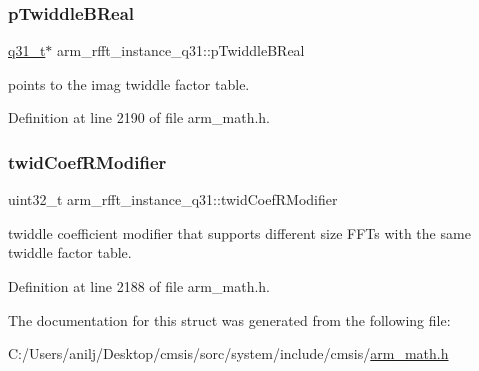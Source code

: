 \subsubsection{\texorpdfstring{p\+Twiddle\+B\+Real}{pTwiddleBReal}}
{\footnotesize\ttfamily \hyperlink{arm__math_8h_adc89a3547f5324b7b3b95adec3806bc0}{q31\+\_\+t}$\ast$ arm\+\_\+rfft\+\_\+instance\+\_\+q31\+::p\+Twiddle\+B\+Real}

points to the imag twiddle factor table. 

Definition at line 2190 of file arm\+\_\+math.\+h.

\mbox{\label{structarm__rfft__instance__q31_a6fc90252b579f7c29e01bd279334fc43}} 
\subsubsection{\texorpdfstring{twid\+Coef\+R\+Modifier}{twidCoefRModifier}}
{\footnotesize\ttfamily uint32\+\_\+t arm\+\_\+rfft\+\_\+instance\+\_\+q31\+::twid\+Coef\+R\+Modifier}

twiddle coefficient modifier that supports different size F\+F\+Ts with the same twiddle factor table. 

Definition at line 2188 of file arm\+\_\+math.\+h.



The documentation for this struct was generated from the following file\+:\begin{DoxyCompactItemize}
\item 
C\+:/\+Users/anilj/\+Desktop/cmsis/sorc/system/include/cmsis/\hyperlink{arm__math_8h}{arm\+\_\+math.\+h}\end{DoxyCompactItemize}
